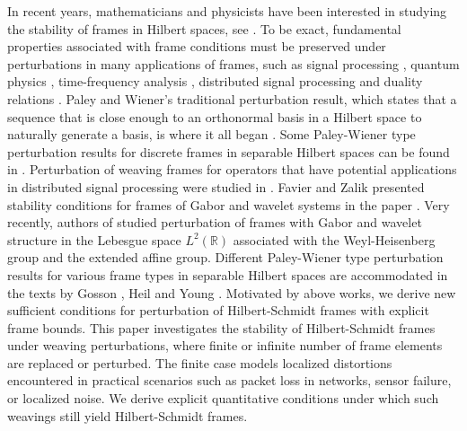 \documentclass[reqno]{amsart}
\theoremstyle{plain}
\theoremstyle{remark}
\numberwithin{equation}{section}
\begin{document}
In recent years, mathematicians and physicists have been interested in studying the stability of frames in Hilbert spaces, see \cite{GossonI, GossonII, H11, Young}. To be exact, fundamental properties associated with frame conditions must be preserved under perturbations in many applications of frames, such as  signal processing \cite{BHan, H11}, quantum physics \cite{GossonI}, time-frequency analysis \cite{KG}, distributed signal processing \cite{DVV17, DV17ar, VD3} and duality relations \cite{H11, Young}. Paley and Wiener's traditional perturbation result, which states that a sequence that is close enough to an orthonormal basis in a Hilbert space to naturally generate a basis, is where it all began \cite{H11}. Some Paley-Wiener type perturbation results for discrete frames in separable Hilbert spaces can be found in \cite{CK}. Perturbation of weaving frames for operators that have potential applications in distributed signal processing were studied in \cite{DV17ar}. Favier and Zalik presented stability conditions for frames of Gabor and wavelet systems in the paper \cite{FZUS}.
Very recently, authors of \cite{DivI} studied perturbation of  frames with Gabor and wavelet structure  in  the Lebesgue space $L^2(\mathbb{R})$ associated with  the Weyl-Heisenberg group and the extended affine group.
Different Paley-Wiener type perturbation results for various frame types in separable Hilbert spaces are accommodated in the texts by Gosson \cite{GossonII}, Heil \cite{H11}  and Young \cite{Young}. Motivated by above works, we derive new sufficient conditions for perturbation of Hilbert-Schmidt frames with explicit frame bounds. This paper investigates the stability of Hilbert-Schmidt frames under weaving perturbations, where finite or infinite number of frame elements are replaced or perturbed. The finite case models localized distortions encountered in practical scenarios such as packet loss in networks, sensor failure, or localized noise. We derive explicit quantitative conditions under which such weavings still yield Hilbert-Schmidt frames.


\end{document}
